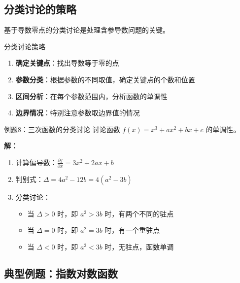 \documentclass[a4paper,11pt]{ctexart}
\newcommand{\partialder}[2]{\frac{\partial #1}{\partial #2}}
\theoremstyle{definition}
\theoremstyle{remark}
\begin{document}
\subsection{分类讨论的策略}

基于导数零点的分类讨论是处理含参导数问题的关键。

\begin{methodbox}{分类讨论策略}
\begin{enumerate}
    \item \textbf{确定关键点}：找出导数等于零的点
    \item \textbf{参数分类}：根据参数的不同取值，确定关键点的个数和位置
    \item \textbf{区间分析}：在每个参数范围内，分析函数的单调性
    \item \textbf{边界情况}：特别注意参数取边界值的情况
\end{enumerate}
\end{methodbox}

\begin{examplebox}{例题8：三次函数的分类讨论}
讨论函数 $f(x) = x^3 + ax^2 + bx + c$ 的单调性。

\textbf{解：}
\begin{enumerate}
    \item 计算偏导数：$\partialder{f}{x} = 3x^2 + 2ax + b$
    \item 判别式：$\Delta = 4a^2 - 12b = 4(a^2 - 3b)$
    \item 分类讨论：
    \begin{itemize}
        \item 当 $\Delta > 0$ 时，即 $a^2 > 3b$ 时，有两个不同的驻点
        \item 当 $\Delta = 0$ 时，即 $a^2 = 3b$ 时，有一个重驻点
        \item 当 $\Delta < 0$ 时，即 $a^2 < 3b$ 时，无驻点，函数单调
    \end{itemize}
\end{enumerate}
\end{examplebox}

\subsection{典型例题：指数对数函数}
\end{document}
